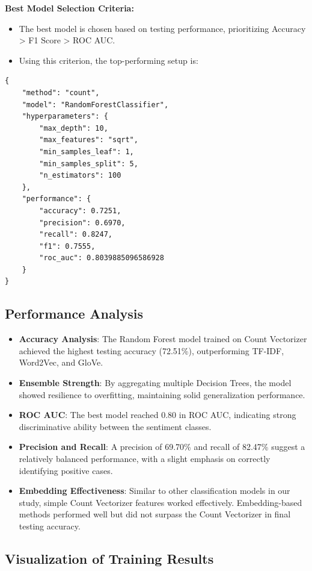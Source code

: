 \textbf{Best Model Selection Criteria:}

\begin{itemize}
    \item The best model is chosen based on testing performance, prioritizing Accuracy > F1 Score > ROC AUC.
    \item Using this criterion, the top-performing setup is:
\end{itemize}

\begin{verbatim}
{
    "method": "count",
    "model": "RandomForestClassifier",
    "hyperparameters": {
        "max_depth": 10,
        "max_features": "sqrt",
        "min_samples_leaf": 1,
        "min_samples_split": 5,
        "n_estimators": 100
    },
    "performance": {
        "accuracy": 0.7251,
        "precision": 0.6970,
        "recall": 0.8247,
        "f1": 0.7555,
        "roc_auc": 0.8039885096586928
    }
}
\end{verbatim}

\subsection{Performance Analysis}

\begin{itemize}
    \item \textbf{Accuracy Analysis}: The Random Forest model trained on Count Vectorizer achieved the highest testing accuracy (72.51\%), outperforming TF-IDF, Word2Vec, and GloVe.
    \item \textbf{Ensemble Strength}: By aggregating multiple Decision Trees, the model showed resilience to overfitting, maintaining solid generalization performance.
    \item \textbf{ROC AUC}: The best model reached 0.80 in ROC AUC, indicating strong discriminative ability between the sentiment classes.
    \item \textbf{Precision and Recall}: A precision of 69.70\% and recall of 82.47\% suggest a relatively balanced performance, with a slight emphasis on correctly identifying positive cases.
    \item \textbf{Embedding Effectiveness}: Similar to other classification models in our study, simple Count Vectorizer features worked effectively. Embedding-based methods performed well but did not surpass the Count Vectorizer in final testing accuracy.
\end{itemize}

\subsection{Visualization of Training Results}

